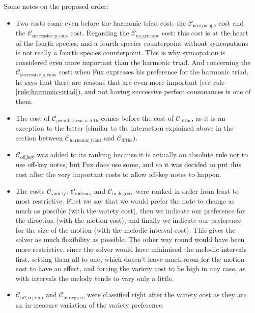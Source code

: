 Some notes on the proposed order: 
\begin{itemize}
    \item Two costs come even before the harmonic triad cost: the $\mathcal{C}_\text{no\_syncope}$ cost and the $\mathcal{C}_\text{successive\_p\_cons}$ cost. Regarding the $\mathcal{C}_\text{no\_syncope}$ cost: this cost is at the heart of the fourth species, and a fourth species counterpoint without syncopations is not really a fourth species counterpoint. This is why syncopation is considered even more important than the harmonic triad. And concerning the $\mathcal{C}_\text{successive\_p\_cons}$ cost: when Fux expresses his preference for the harmonic triad, he says that there are reasons that are even more important (see rule \ref{rule:harmonic-triad}), and not having successive perfect consonances is one of them.
    \item The cost of $\mathcal{C}_\text{penult\_thesis\_is\_fifth}$ comes before the cost of $\mathcal{C}_\text{fifths}$, as it is an exception to the latter (similar to the interaction explained above in the section between $\mathcal{C}_\text{harmonic\_triad}$ and $\mathcal{C}_\text{fifths})$.
    
    \item $\mathcal{C}_\text{off\_key}$ was added to its ranking because it is actually an absolute rule not to use off-key notes, but Fux does use some, and so it was decided to put this cost after the very important costs to allow off-key notes to happen.

    \item The costs $\mathcal{C}_\text{variety}$, $\mathcal{C}_\text{motions}$ and $\mathcal{C}_\text{m\_degrees}$ were ranked in order from least to most restrictive. First we say that we would prefer the note to change as much as possible (with the variety cost), then we indicate our preference for the direction (with the motion cost), and finally we indicate our preference for the size of the motion (with the melodic interval cost). This gives the solver as much flexibility as possible. The other way round would have been more restrictive, since the solver would have minimised the melodic intervals first, setting them all to one, which doesn't leave much room for the motion cost to have an effect, and forcing the variety cost to be high in any case, as with  intervals the melody tends to vary only a little.
    
    \item $\mathcal{C}_\text{m2\_eq\_zero}$ and $\mathcal{C}_\text{m\_degrees}$ were classified right after the variety cost as they are an in-measure variation of the variety preference.

\end{itemize}


